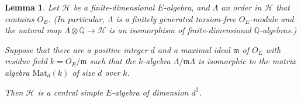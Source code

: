 \documentclass[12pt,a4paper,reqno]{amsart}
\def\Q{{\mathbb Q}}
\def\Mat{\mathrm{Mat}}
\newtheorem{lem}[thm]{Lemma}
\theoremstyle{definition}
\begin{document}
\begin{lem}
\label{redMatrix}
Let $\mathcal{H}$ be a finite-dimensional 
$E$-algebra, and $\Lambda$  an order in  $\mathcal{H}$ that contains $O_E$.
(In particular,  $\Lambda$ is a finitely generated torsion-free $O_E$-module and 
 the natural map
$\Lambda\otimes  \Q\to \mathcal{H}$ is an isomorphism of finite-dimensional $\Q$-algebras.)

Suppose that there are a positive integer $d$ and   a maximal ideal $\mathfrak{m}$  of $O_E$ with residue field $k=O_E/\mathfrak{m}$ such that the $k$-algebra
$\Lambda/\mathfrak{m}\Lambda$ is isomorphic to the matrix algebra $\Mat_d(k)$ of size $d$ over $k$.

Then $\mathcal{H}$ is a central simple $E$-algebra of dimension $d^2$.
\end{lem}
\end{document}
